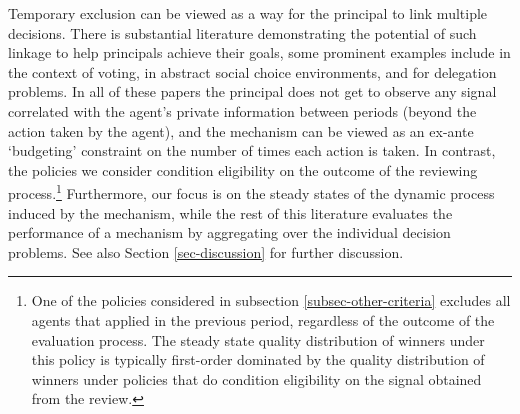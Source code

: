 \documentclass[12pt]{article}
\theoremstyle{plain}
\theoremstyle{definition}
\theoremstyle{remark}
\begin{document}
Temporary exclusion can be viewed as a way for the principal to link multiple decisions. There is substantial literature demonstrating the potential of such linkage to help principals achieve their goals, some prominent examples include \citet{casella2005storable} in the context of voting, \citet{jackson2007overcoming} in abstract social choice environments, and \citet{frankel2014aligned, frankel2016delegating, frankel2016discounted} for delegation problems. In all of these papers the principal does not get to observe any signal correlated with the agent's private information between periods (beyond the action taken by the agent), and the mechanism can be viewed as an ex-ante `budgeting' constraint on the number of times each action is taken. In contrast, the policies we consider condition eligibility on the outcome of the reviewing process.\footnote{One of the policies considered in subsection \ref{subsec-other-criteria} excludes all agents that applied in the previous period, regardless of the outcome of the evaluation process. The steady state quality distribution of winners under this policy is typically first-order dominated by the quality distribution of winners under policies that do condition eligibility on the signal obtained from the review.} Furthermore, our focus is on the steady states of the dynamic process induced by the mechanism, while the rest of this literature evaluates the performance of a mechanism by aggregating over the individual decision problems. See also Section \ref{sec-discussion} for further discussion.


\end{document}
